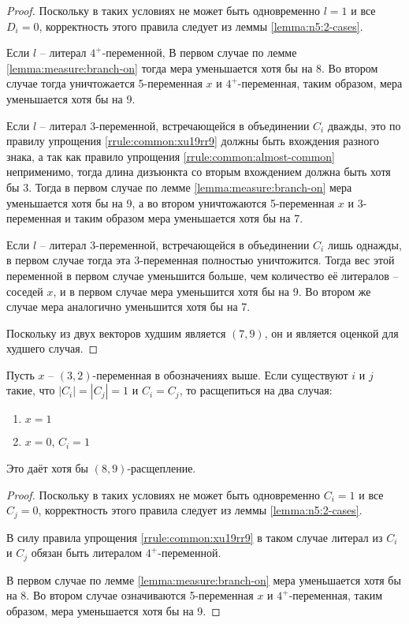 \begin{proof}
 Поскольку в таких условиях не может быть одновременно $l = 1$ и все $D_i = 0$, корректность этого правила следует из леммы \ref{lemma:n5:2-cases}.

 Если $l$ -- литерал $4^+$-переменной, В первом случае по лемме \ref{lemma:measure:branch-on} тогда мера уменьшается хотя бы на 8. Во втором случае тогда уничтожается 5-переменная $x$ и $4^+$-переменная, таким образом, мера уменьшается хотя бы на 9.

 Если $l$ -- литерал 3-переменной, встречающейся в объединении $C_i$ дважды, это по правилу упрощения \ref{rrule:common:xu19rr9} должны быть вхождения разного знака, а так как правило упрощения \ref{rrule:common:almost-common} неприменимо, тогда длина дизъюнкта со вторым вхождением должна быть хотя бы 3. Тогда в первом случае по лемме \ref{lemma:measure:branch-on} мера уменьшается хотя бы на 9, а во втором уничтожаются 5-переменная $x$ и 3-переменная и таким образом мера уменьшается хотя бы на 7.

 Если $l$ -- литерал 3-переменной, встречающейся в объединении $C_i$ лишь однажды, в первом случае тогда эта 3-переменная полностью уничтожится. Тогда вес этой переменной в первом случае уменьшится больше, чем количество её литералов -- соседей $x$, и в первом случае мера уменьшится хотя бы на 9. Во втором же случае мера аналогично уменьшится хотя бы на 7.

 Поскольку из двух векторов худшим является $(7,9)$, он и является оценкой для худшего случая.
\end{proof}

\begin{brule}
 Пусть $x$ -- $(3,2)$-переменная в обозначениях выше. Если существуют $i$ и $j$ такие, что $|C_i| = |C_j| = 1$ и $C_i = C_j$, то расщепиться на два случая:

 \begin{enumerate}
  \item $x = 1$
  \item $x = 0$, $C_i = 1$
 \end{enumerate}

 Это даёт хотя бы $(8,9)$-расщепление.
 \label{brule:n5:32-rest:same-c}
\end{brule}

\begin{proof}
 Поскольку в таких условиях не может быть одновременно $C_i = 1$ и все $C_j = 0$, корректность этого правила следует из леммы \ref{lemma:n5:2-cases}.

 В силу правила упрощения \ref{rrule:common:xu19rr9} в таком случае литерал из $C_i$ и $C_j$ обязан быть литералом $4^+$-переменной.

 В первом случае по лемме \ref{lemma:measure:branch-on} мера уменьшается хотя бы на 8. Во втором случае означиваются 5-переменная $x$ и $4^+$-переменная, таким образом, мера уменьшается хотя бы на 9.
\end{proof}

